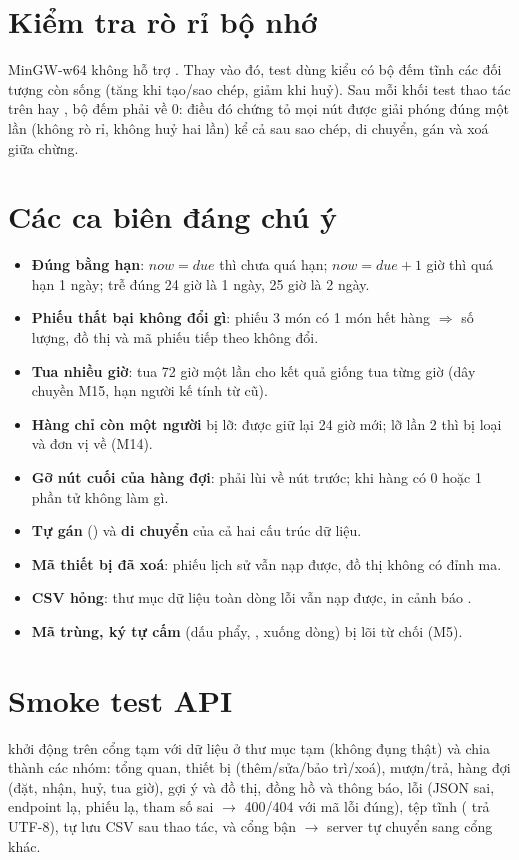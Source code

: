 \section{Kiểm tra rò rỉ bộ nhớ}
MinGW-w64 không hỗ trợ . Thay vào đó, test dùng kiểu  có bộ đếm tĩnh các đối tượng còn sống (tăng khi tạo/sao chép, giảm khi huỷ). Sau mỗi khối test thao tác trên  hay , bộ đếm phải về 0: điều đó chứng tỏ mọi nút được giải phóng đúng một lần (không rò rỉ, không huỷ hai lần) kể cả sau sao chép, di chuyển, gán và xoá giữa chừng.

\section{Các ca biên đáng chú ý}
\begin{itemize}
  \item \textbf{Đúng bằng hạn}: $now = due$ thì chưa quá hạn; $now = due+1$ giờ thì quá hạn 1 ngày; trễ đúng 24 giờ là 1 ngày, 25 giờ là 2 ngày.
  \item \textbf{Phiếu thất bại không đổi gì}: phiếu 3 món có 1 món hết hàng $\Rightarrow$ số lượng, đồ thị và mã phiếu tiếp theo không đổi.
  \item \textbf{Tua nhiều giờ}: tua 72 giờ một lần cho kết quả giống tua từng giờ (dây chuyền M15, hạn người kế tính từ  cũ).
  \item \textbf{Hàng chỉ còn một người} bị lỡ: được giữ lại 24 giờ mới; lỡ lần 2 thì bị loại và đơn vị về  (M14).
  \item \textbf{Gỡ nút cuối của hàng đợi}:  phải lùi về nút trước;  khi hàng có 0 hoặc 1 phần tử không làm gì.
  \item \textbf{Tự gán} () và \textbf{di chuyển} của cả hai cấu trúc dữ liệu.
  \item \textbf{Mã thiết bị đã xoá}: phiếu lịch sử vẫn nạp được, đồ thị không có đỉnh ma.
  \item \textbf{CSV hỏng}: thư mục dữ liệu toàn dòng lỗi vẫn nạp được, in cảnh báo .
  \item \textbf{Mã trùng, ký tự cấm} (dấu phẩy, \code{|}, xuống dòng) bị lõi từ chối (M5).
\end{itemize}

\section{Smoke test API}
 khởi động  trên cổng tạm với dữ liệu ở thư mục tạm (không đụng  thật) và chia thành các nhóm: tổng quan, thiết bị (thêm/sửa/bảo trì/xoá), mượn/trả, hàng đợi (đặt, nhận, huỷ, tua giờ), gợi ý và đồ thị, đồng hồ và thông báo, lỗi (JSON sai, endpoint lạ, phiếu lạ, tham số sai $\to$ 400/404 với mã lỗi đúng), tệp tĩnh ( trả  UTF-8), tự lưu CSV sau thao tác, và cổng bận $\to$ server tự chuyển sang cổng khác.

